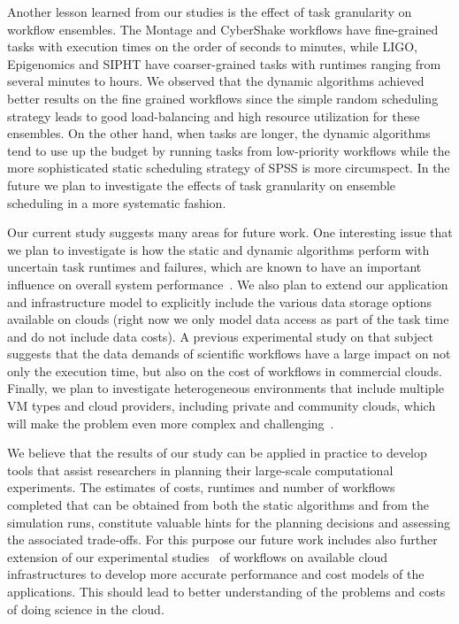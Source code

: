 \documentclass{sig-alternate}
\begin{document}
Another lesson learned from our studies is the effect of task granularity on
workflow ensembles. The Montage and CyberShake workflows have fine-grained tasks
with execution times on the order of seconds to minutes, while LIGO, Epigenomics
and SIPHT have coarser-grained tasks with runtimes ranging from several minutes
to hours. We observed that the dynamic algorithms achieved better results on the
fine grained workflows since the simple random scheduling strategy leads to good
load-balancing and high resource utilization for these ensembles. On the other
hand, when tasks are longer, the dynamic algorithms tend to use up the budget by
running tasks from low-priority workflows while the more sophisticated static
scheduling strategy of SPSS is more circumspect. In the future we plan to
investigate the effects of task granularity on ensemble scheduling in a more
systematic fashion.


Our current study suggests many areas for future work. One interesting
issue that we plan to investigate is how the static and dynamic algorithms 
perform with uncertain task runtimes and failures, which are known to have 
an important influence on overall system performance~\cite{Sakellariou2010,Dongarra2007}. 
We also plan to extend our application and infrastructure model to explicitly 
include the various data storage options available on clouds (right now we only 
model data access as part of the task time and do not include data costs). A previous 
experimental study on that subject~\cite{Juve2010} suggests that the data 
demands of scientific workflows have a large impact on not only the 
execution time, but also on the cost of workflows in commercial clouds. 
Finally, we plan to investigate heterogeneous environments that include 
multiple VM types and cloud providers, including private and community clouds, 
which will make the problem even more complex and challenging~\cite{Marshall2010,vockler11,Juve2010}.

We believe that the results of our study can be applied in practice to develop 
tools that assist researchers in planning their large-scale computational
experiments. The estimates of costs, runtimes and number of workflows completed
that can be obtained from both the static algorithms and from the simulation
runs, constitute valuable hints for the planning decisions and assessing the
associated trade-offs. For this purpose our future work includes also further
extension of our experimental studies~\cite{Juve2009,vockler11} of workflows on
available cloud infrastructures to develop more accurate performance and cost
models of the applications. This should lead to better understanding of the
problems and costs of doing science in the cloud.








\end{document}
